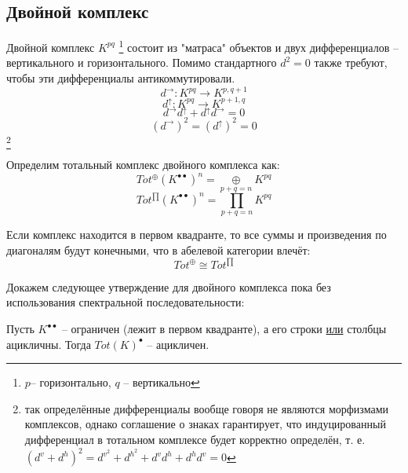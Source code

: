 \documentclass[../main.tex]{subfiles}
\begin{document}
\subsection{Двойной комплекс}
\bee
{}
\eee
\begin{to_def}\label{double_complex}
Двойной комплекс $K^{pq}$ \footnote{$p$-- горизонтально, $q$ -- вертикально} состоит из "матраса" объектов и двух дифференциалов -- вертикального и горизонтального. Помимо стандартного  $d^2=0$ также требуют, чтобы эти дифференциалы антикоммутировали.
\[d^{\rightarrow}\colon K^{pq}\to K^{p, q+1}\]
\[d^{\uparrow}\colon K^{pq}\to K^{p+1, q}\]
\[d^{\rightarrow}d^{\uparrow} + d^{\uparrow}d^{\rightarrow} = 0\]
\[(d^{\rightarrow})^2 = (d^{\uparrow})^2 = 0\]\footnote{так определённые дифференциалы вообще говоря не являются морфизмами комплексов, однако соглашение о знаках гарантирует, что индуцированный дифференциал в тотальном комплексе будет корректно определён, т. е. $(d^v + d^h)^2 = d^v^2 + d^h^2 + d^v d^h + d^h d^v = 0 $}
\end{to_def}
\begin{to_def}
Определим тотальный комплекс двойного комплекса как:
\[Tot^{\oplus}(K^{\bullet\bullet})^n = \underset{p+q=n}{\oplus}K^{pq}\]
\[Tot^{\prod}(K^{\bullet\bullet})^n = \underset{p+q=n}{\prod}K^{pq}\]
\end{to_def}
\begin{to_claim}
Если комплекс находится в первом квадранте, то все суммы и произведения по диагоналям будут конечными, что в абелевой категории влечёт:
\[Tot^{\oplus} \cong Tot^{\prod}\]
\end{to_claim}
Докажем следующее утверждение для двойного комплекса пока без использования спектральной последовательности:
\begin{to_claim}\label{ac_tot}
Пусть $K^{\bullet\bullet}$ -- ограничен (лежит в первом квадранте), а его строки \underline{или} столбцы ацикличны. Тогда $Tot(K)^\bullet$ -- ацикличен.
\end{to_claim}
\end{document}
